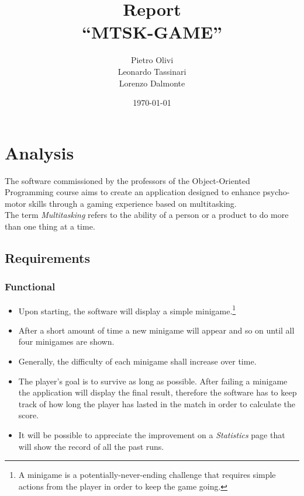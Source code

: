\documentclass[a4paper,12pt]{report}
\title{Report\\ \textbf {``MTSK-GAME''}}
\author{Pietro Olivi\\
Leonardo Tassinari\\
Lorenzo Dalmonte}
\date{\today}
\begin{document}
\maketitle

\tableofcontents

\chapter{Analysis}
The software commissioned by the professors of the Object-Oriented Pro\-gramming course aims to create an application designed to enhance psycho-motor skills through a gaming experience based on multitasking.\\
The term \textit{Multitasking} refers to the ability of a person or a product to do more than one thing at a time.

\section{Requirements}
\subsection*{Functional}
\begin{itemize}
	\item Upon starting, the software will display a simple minigame.\footnote{A minigame is a potentially-never-ending challenge that requires simple actions from the player in order to keep the game going.}
	\item After a short amount of time a new minigame will appear and so on until all four minigames are shown.
	\item Generally, the difficulty of each minigame shall increase over time.
	\item The player's goal is to survive as long as possible. After failing a minigame the application will display the final result,
	      therefore the software has to keep track of how long the player has lasted in the match in order to calculate the score.
	\item It will be possible to appreciate the improvement on a \textit{Statistics} page that will show the record of all the past runs.
\end{itemize}
\end{document}
